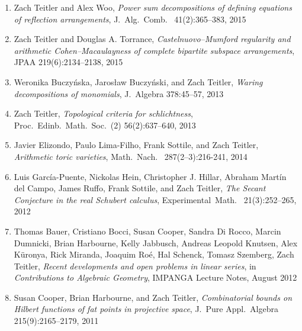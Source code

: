 \documentclass[12pt]{article}
\begin{document}
\begin{enumerate}[1.]
\item Zach Teitler and Alex Woo,
\emph{Power sum decompositions of defining equations of reflection arrangements},
J.~Alg.\ Comb.\
41(2):365--383, 2015

\item Zach Teitler and Douglas A. Torrance,
\emph{Castelnuovo--Mumford regularity and arithmetic Cohen--Macaulayness of complete bipartite subspace arrangements},
JPAA
219(6):2134--2138, 2015

\item Weronika Buczy\'nska, Jaros{\l}aw Buczy\'nski, and Zach Teitler,
\emph{Waring decompositions of monomials},
J.\ Algebra
378:45--57, 2013

\item Zach Teitler,
\emph{Topological criteria for schlichtness},
Proc.\ Edinb.\ Math.\ Soc.\ (2)
56(2):637--640, 2013

\item Javier Elizondo, Paulo Lima-Filho, Frank Sottile, and Zach Teitler,
\emph{Arithmetic toric varieties},
Math.\ Nach.\
287(2--3):216-241, 2014

\item Luis Garc\'ia-Puente, Nickolas Hein, Christopher J. Hillar, Abraham Mart\'in del Campo, James Ruffo, Frank Sottile, and Zach Teitler,
\emph{The Secant Conjecture in the real Schubert calculus},
Experimental~Math.\
21(3):252--265, 2012

\item
Thomas Bauer, Cristiano Bocci, Susan Cooper, Sandra Di Rocco, Marcin Dumnicki, Brian Harbourne, Kelly Jabbusch, Andreas Leopold Knutsen, Alex K\"uronya,
Rick Miranda, Joaquim Ro\'e, Hal Schenck, Tomasz Szemberg, Zach Teitler,
\emph{Recent developments and open problems in linear series},
in \textit{Contributions to Algebraic Geometry}, IMPANGA Lecture Notes, August 2012

\item Susan Cooper, Brian Harbourne, and Zach Teitler,
\emph{Combinatorial bounds on Hilbert functions of fat points in projective space},
J.\ Pure Appl.\ Algebra
215(9):2165--2179, 2011


\end{enumerate}
\end{document}
